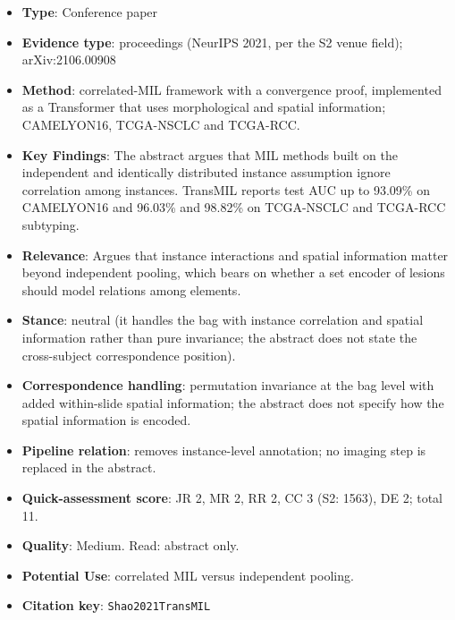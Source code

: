 \documentclass[journal,onecolumn]{IEEEtran}
\begin{document}
\begin{itemize}

\item{} \textbf{Type}: Conference paper

\item{} \textbf{Evidence type}: proceedings (NeurIPS 2021, per the S2 venue field); arXiv:2106.00908

\item{} \textbf{Method}: correlated-MIL framework with a convergence proof, implemented as a Transformer that uses morphological and spatial information; CAMELYON16, TCGA-NSCLC and TCGA-RCC.

\item{} \textbf{Key Findings}: The abstract argues that MIL methods built on the independent and identically distributed instance assumption ignore correlation among instances. TransMIL reports test AUC up to 93.09\% on CAMELYON16 and 96.03\% and 98.82\% on TCGA-NSCLC and TCGA-RCC subtyping.

\item{} \textbf{Relevance}: Argues that instance interactions and spatial information matter beyond independent pooling, which bears on whether a set encoder of lesions should model relations among elements.

\item{} \textbf{Stance}: neutral (it handles the bag with instance correlation and spatial information rather than pure invariance; the abstract does not state the cross-subject correspondence position).

\item{} \textbf{Correspondence handling}: permutation invariance at the bag level with added within-slide spatial information; the abstract does not specify how the spatial information is encoded.

\item{} \textbf{Pipeline relation}: removes instance-level annotation; no imaging step is replaced in the abstract.

\item{} \textbf{Quick-assessment score}: JR 2, MR 2, RR 2, CC 3 (S2: 1563), DE 2; total 11.

\item{} \textbf{Quality}: Medium. Read: abstract only.

\item{} \textbf{Potential Use}: correlated MIL versus independent pooling.

\item{} \textbf{Citation key}: \texttt{Shao2021TransMIL}

\end{itemize}
\end{document}
